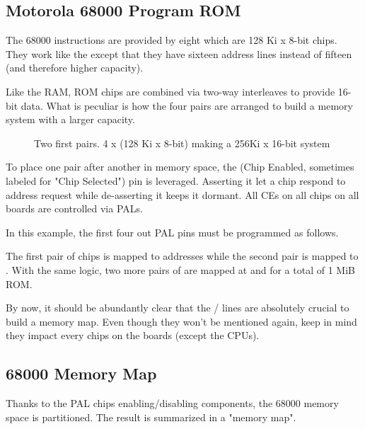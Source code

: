 \subsection{Motorola 68000 Program ROM}


The 68000 instructions are provided by eight  which are 128 Ki x 8-bit chips. They work like the  except that they have sixteen address lines instead of fifteen (and therefore higher capacity).

Like the RAM, ROM chips are combined via two-way interleaves to provide 16-bit data. What is peculiar is how the four pairs are arranged to build a memory system with a larger capacity.


\begin{figure}[H]
\caption*{Two first pairs. 4 x (128 Ki x 8-bit) making a 256Ki x 16-bit system}
\end{figure}

To place one pair after another in memory space, the  (Chip Enabled, sometimes labeled  for "Chip Selected") pin is leveraged. Asserting it let a chip respond to address request while de-asserting it keeps it dormant. All CEs on all chips on all boards are controlled via PALs.

In this example, the first four out PAL pins must be programmed as follows.




The first pair of chips is mapped to addresses  while the second pair is mapped to . With the same logic, two more pairs of  are mapped at  and  for a total of 1 MiB ROM.



By now, it should be abundantly clear that the  /  lines are absolutely crucial to build a memory map. Even though they won't be mentioned again, keep in mind they impact every chips on the boards (except the CPUs).

\subsection{68000 Memory Map}

Thanks to the PAL chips enabling/disabling components, the 68000 memory space is partitioned. The result is summarized in a "memory map".

